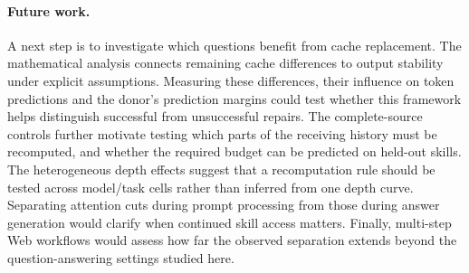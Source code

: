 \paragraph{Future work.}
A next step is to investigate which questions benefit from cache
replacement. The mathematical analysis connects remaining cache
differences to output stability under explicit assumptions. Measuring
these differences, their influence on token predictions and the donor's
prediction margins could test whether this framework helps distinguish
successful from unsuccessful repairs. The complete-source controls further motivate testing which parts of
the receiving history must be recomputed, and whether the required budget
can be predicted on held-out skills. The heterogeneous depth effects suggest that a recomputation rule should
be tested across model/task cells rather than inferred from one depth curve. Separating attention cuts during prompt
processing from those during answer generation would clarify when continued
skill access matters. Finally,
multi-step Web workflows would assess how far the observed separation
extends beyond the question-answering settings studied here.
